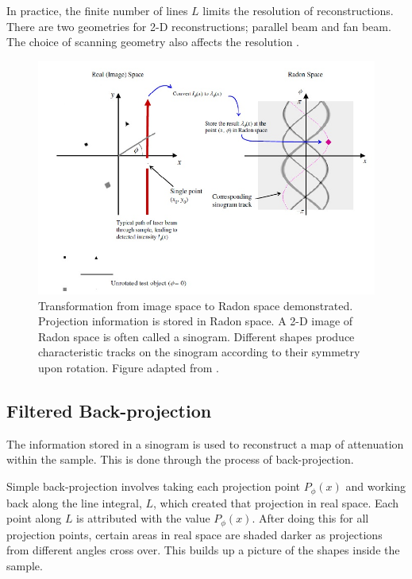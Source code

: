 \documentclass[12pt]{article}
\begin{document}
In practice, the finite number of lines $L$ limits the resolution of reconstructions. There are two geometries for 2-D reconstructions; parallel beam and fan beam. The choice of scanning geometry also affects the resolution \cite{natterer2001mathematics}.

\begin{figure}[H]
\centering
\includegraphics[width=\textwidth]{Doran_2008_sinogram.jpg}
\caption{Transformation from image space to Radon space demonstrated. Projection information is stored in Radon space. A 2-D image of Radon space is often called a sinogram. Different shapes produce characteristic tracks on the sinogram according to their symmetry upon rotation. Figure adapted from \cite{Doran:2008kh}.}
\label{fig:sinogram}
\end{figure}







\subsection{Filtered Back-projection}
\label{subsec:FBP}

The information stored in a sinogram is used to reconstruct a map of attenuation within the sample. This is done through the process of back-projection.

Simple back-projection involves  taking each projection point $P_{\phi}(x)$ and working back along the line integral, $L$, which created that projection in real space. Each point along $L$ is  attributed with the value $P_{\phi}(x)$. After doing this for all projection points, certain areas in real space are shaded darker as projections from different angles cross over. This builds up a picture of the shapes inside the sample. 
\end{document}
